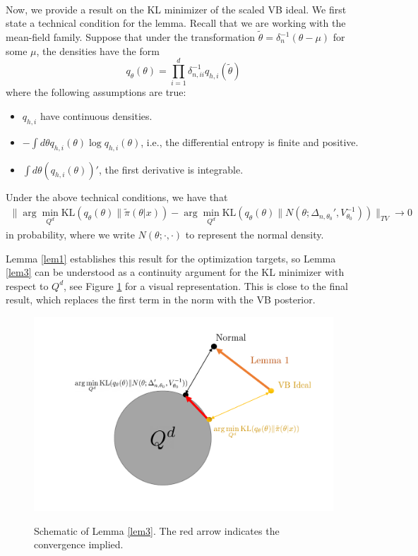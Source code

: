 \paragraph{} Now, we provide a result on the KL minimizer of the scaled VB ideal. We first state a technical condition for the lemma. Recall that we are working with the mean-field family. Suppose that under the transformation $\tilde{\theta} = \delta_n^{-1}(\theta - \mu)$ for some $\mu$, the densities have the form
$$
q_{\theta}(\theta) = \prod_{i=1}^d \delta^{-1}_{n,ii}q_{h,i}(\tilde{\theta})
$$
%
where the following assumptions are true:
\begin{itemize}
	\item $q_{h,i}$ have continuous densities.
	\item $- \int d\theta q_{h,i}(\theta) \log q_{h, i}(\theta)$, i.e., the differential entropy is finite and positive.
	\item $\int d\theta (q_{h,i}(\theta))'$, the first derivative is integrable. 
\end{itemize}

\begin{lemma}
	\label{lem3}
	Under the above technical conditions, we have that 
	\begin{gather*}
	\| \arg\min_{Q^d} \text{KL}(q_{\theta}(\theta)\|  \tilde{\pi}(\theta|x))   -
	\arg\min_{Q^d} \text{KL}(q_{\theta}(\theta)\| N(\theta; \Delta_{n, \theta_0}', V^{-1}_{\theta_0}))\|_{TV} \to 0
	\end{gather*}
	in probability, where we write $N(\theta; \cdot, \cdot)$ to represent the normal density. 
\end{lemma}

Lemma \ref{lem1} establishes this result for the optimization targets, so Lemma \ref{lem3} can be understood as a continuity argument for the KL minimizer with respect to $Q^d$, see Figure \ref{lemma3fig} for a visual representation. This is close to the final result, which replaces the first term in the norm with the VB posterior.

\begin{figure}[h!]
	\centering
	\includegraphics[width = 0.8\linewidth]{graphics/fig1.pdf}
	\label{lemma3fig}
	\caption{Schematic of Lemma \ref{lem3}. The red arrow indicates the convergence implied.}
\end{figure} 

